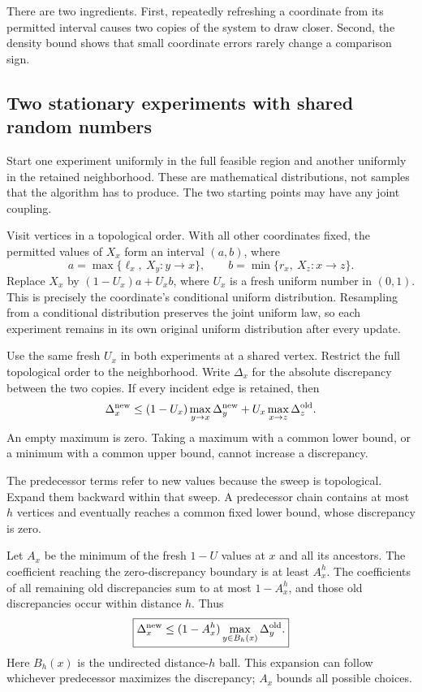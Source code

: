 There are two ingredients. First, repeatedly refreshing a coordinate from its permitted interval causes two copies of the system to draw closer. Second, the density bound shows that small coordinate errors rarely change a comparison sign.

\subsection{Two stationary experiments with shared random numbers}

Start one experiment uniformly in the full feasible region and another uniformly in the retained neighborhood. These are mathematical distributions, not samples that the algorithm has to produce. The two starting points may have any joint coupling.

Visit vertices in a topological order. With all other coordinates fixed, the permitted values of \(X_x\) form an interval \((a,b)\), where
\[
a=\max\{\ell_x,\ X_y:y\to x\},\qquad
b=\min\{r_x,\ X_z:x\to z\}.
\]
Replace \(X_x\) by \((1-U_x)a+U_xb\), where \(U_x\) is a fresh uniform number in \((0,1)\). This is precisely the coordinate's conditional uniform distribution. Resampling from a conditional distribution preserves the joint uniform law, so each experiment remains in its own original uniform distribution after every update.

Use the same fresh \(U_x\) in both experiments at a shared vertex. Restrict the full topological order to the neighborhood. Write \(\Delta_x\) for the absolute discrepancy between the two copies. If every incident edge is retained, then
\begin{equation}\label{eq:coupling}
\Delta_x^{\rm new}
\le(1-U_x)\max_{y\to x}\Delta_y^{\rm new}
  +U_x\max_{x\to z}\Delta_z^{\rm old}.
\end{equation}
An empty maximum is zero. Taking a maximum with a common lower bound, or a minimum with a common upper bound, cannot increase a discrepancy.

The predecessor terms refer to new values because the sweep is topological. Expand them backward within that sweep. A predecessor chain contains at most \(h\) vertices and eventually reaches a common fixed lower bound, whose discrepancy is zero.

Let \(A_x\) be the minimum of the fresh \(1-U\) values at \(x\) and all its ancestors. The coefficient reaching the zero-discrepancy boundary is at least \(A_x^h\). The coefficients of all remaining old discrepancies sum to at most \(1-A_x^h\), and those old discrepancies occur within distance \(h\). Thus
\begin{equation}\label{eq:one-sweep}
\boxed{
\Delta_x^{\rm new}\le
(1-A_x^h)\max_{y\in B_h(x)}\Delta_y^{\rm old}.
}
\end{equation}
Here \(B_h(x)\) is the undirected distance-\(h\) ball. This expansion can follow whichever predecessor maximizes the discrepancy; \(A_x\) bounds all possible choices.


